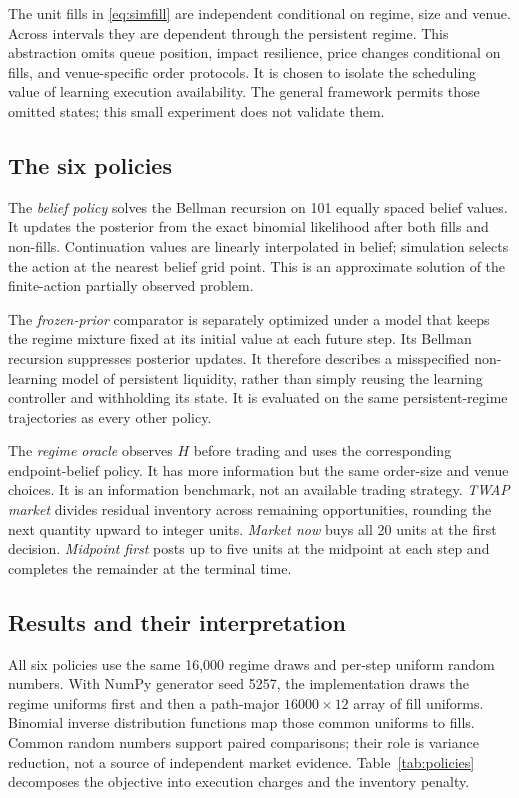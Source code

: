 \documentclass[11pt]{article}
\numberwithin{equation}{section}
\theoremstyle{definition}
\theoremstyle{remark}
\theoremstyle{definition}
\begin{document}
The unit fills in \eqref{eq:simfill} are independent conditional on regime,
size and venue. Across intervals they are dependent through the persistent
regime. This abstraction omits queue position, impact resilience, price changes
conditional on fills, and venue-specific order protocols. It is chosen to
isolate the scheduling value of learning execution availability. The general
framework permits those omitted states; this small experiment does not validate
them.

\subsection{The six policies}

The \emph{belief policy} solves the Bellman recursion on 101 equally spaced
belief values. It updates the posterior from the exact binomial likelihood
after both fills and non-fills. Continuation values are linearly interpolated
in belief; simulation selects the action at the nearest belief grid point.
This is an approximate solution of the finite-action partially observed problem.

The \emph{frozen-prior} comparator is separately optimized under a model that
keeps the regime mixture fixed at its initial value at each future step. Its
Bellman recursion suppresses posterior updates. It therefore describes a
misspecified non-learning model of persistent liquidity, rather than simply
reusing the learning controller and withholding its state. It is evaluated
on the same persistent-regime trajectories as every other policy.

The \emph{regime oracle} observes $H$ before trading and uses the corresponding
endpoint-belief policy. It has more information but the same order-size and
venue choices. It is an information benchmark, not an available trading strategy.
\emph{TWAP market} divides residual inventory across remaining opportunities,
rounding the next quantity upward to integer units. \emph{Market now} buys all
20 units at the first decision. \emph{Midpoint first} posts up to five units
at the midpoint at each step and completes the remainder at the terminal time.

\subsection{Results and their interpretation}

All six policies use the same 16,000 regime draws and per-step uniform random
numbers. With NumPy generator seed 5257, the implementation draws the regime
uniforms first and then a path-major $16000\times12$ array of fill uniforms.
Binomial inverse distribution functions map those common uniforms to fills. Common random numbers support paired comparisons;
their role is variance reduction, not a source of independent market evidence.
Table~\ref{tab:policies} decomposes the objective into execution charges and
the inventory penalty.
\end{document}
